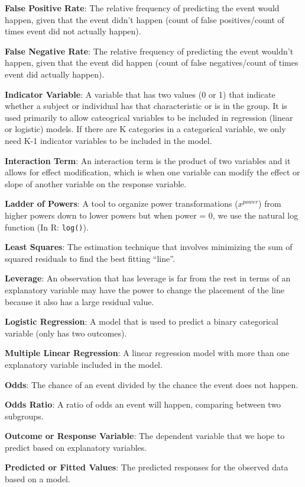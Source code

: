 \documentclass[]{book}
\begin{document}
\textbf{False Positive Rate}: The relative frequency of predicting the event would happen, given that the event didn't happen (count of false positives/count of times event did not actually happen).

\textbf{False Negative Rate}: The relative frequency of predicting the event wouldn't happen, given that the event did happen (count of false negatives/count of times event did actually happen).

\textbf{Indicator Variable}: A variable that has two values (0 or 1) that indicate whether a subject or individual has that characteristic or is in the group. It is used primarily to allow cateogrical variables to be included in regression (linear or logistic) models. If there are K categories in a categorical variable, we only need K-1 indicator variables to be included in the model.

\textbf{Interaction Term}: An interaction term is the product of two variables and it allows for effect modification, which is when one variable can modify the effect or slope of another variable on the response variable.

\textbf{Ladder of Powers}: A tool to organize power transformations (\(x^{power}\)) from higher powers down to lower powers but when power = 0, we use the natural log function (In R: \texttt{log()}).

\textbf{Least Squares}: The estimation technique that involves minimizing the sum of squared residuals to find the best fitting ``line''.

\textbf{Leverage}: An observation that has leverage is far from the rest in terms of an explanatory variable may have the power to change the placement of the line because it also has a large residual value.

\textbf{Logistic Regression}: A model that is used to predict a binary categorical variable (only has two outcomes).

\textbf{Multiple Linear Regression}: A linear regression model with more than one explanatory variable included in the model.

\textbf{Odds}: The chance of an event divided by the chance the event does not happen.

\textbf{Odds Ratio}: A ratio of odds an event will happen, comparing between two subgroups.

\textbf{Outcome or Response Variable}: The dependent variable that we hope to predict based on explanatory variables.

\textbf{Predicted or Fitted Values}: The predicted responses for the observed data based on a model.
\end{document}
